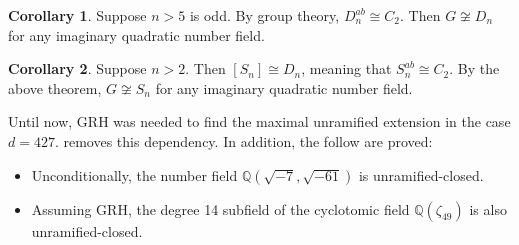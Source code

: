 \documentclass[12pt]{extarticle}
\newcommand{\Q}{\mathbb{Q}}
\newcommand{\<}{\langle}
\renewcommand{\>}{\rangle}
\theoremstyle{definition}
\newtheorem{corollary}{Corollary}
\begin{document}
\begin{corollary}
Suppose $n>5$ is odd. By group theory, $D_n^{ab} \cong C_2$. Then $G \not \cong D_n$ for any imaginary quadratic number field.
\end{corollary}
\begin{corollary}
Suppose $n>2$. Then $[S_n] \cong D_n$, meaning that $S_n^{ab} \cong C_2$. By the above theorem, $G \not \cong S_n$ for any imaginary quadratic number field.
\end{corollary}
Until now, GRH was needed to find the maximal unramified extension in the case $d = 427$. \cite{Wong2015} removes this dependency. In addition, the follow are proved:
\begin{itemize}
\item Unconditionally, the number field $\Q(\sqrt{-7},\sqrt{-61})$ is unramified-closed.
\item  Assuming GRH, the degree 14 subfield of the cyclotomic field $\Q(\zeta_49)$ is also unramified-closed. 
\end{itemize}
\end{document}
